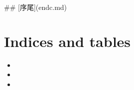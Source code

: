 \documentclass[letterpaper,10pt,english]{sphinxmanual}
\begin{document}
\#\# {[}序尾{]}(endc.md)


\chapter{Indices and tables}
\label{\detokenize{index:indices-and-tables}}\begin{itemize}
\item {} 

\item {} 

\item {} 

\end{itemize}



\renewcommand{\indexname}{Index}
\printindex
\end{document}
